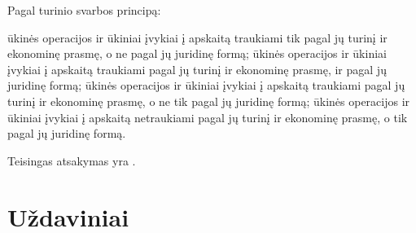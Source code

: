 \begin{tasks}
  \begin{task}
    \begin{condition}
      Pagal turinio svarbos principą:
      \begin{enumerate}
         ūkinės operacijos ir ūkiniai įvykiai į apskaitą
          traukiami tik pagal jų turinį ir ekonominę prasmę, o ne
          pagal jų juridinę formą;
         ūkinės operacijos ir ūkiniai įvykiai į apskaitą
          traukiami pagal jų turinį ir ekonominę prasmę, ir pagal
          jų juridinę formą;
         ūkinės operacijos ir ūkiniai įvykiai į apskaitą
          traukiami pagal jų turinį ir ekonominę prasmę, o ne tik
          pagal jų juridinę formą;
         ūkinės operacijos ir ūkiniai įvykiai į apskaitą
          netraukiami pagal jų turinį ir ekonominę prasmę, o tik
          pagal jų juridinę formą.
      \end{enumerate}
    \end{condition}
    \begin{solution}
      Teisingas atsakymas yra .
    \end{solution}
  \end{task}
  
\end{tasks}

\chapter{Uždaviniai}


